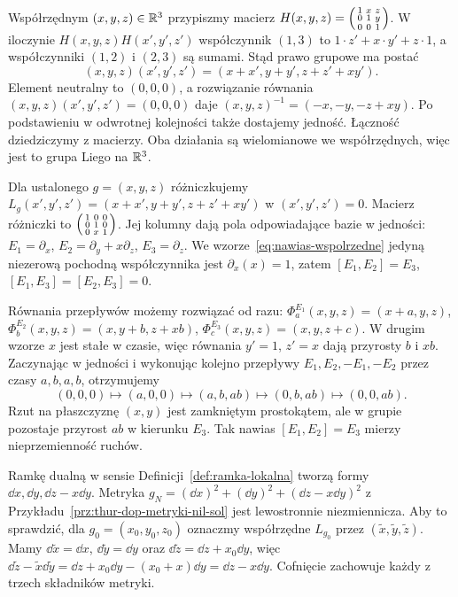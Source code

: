 \begin{przyklad}
\label{prz:lie-heisenberg}
Współrzędnym $(x,y,z)\in\mathbb{R}^3$ przypiszmy macierz
$H(x,y,z)=\begin{psmallmatrix}1&x&z\\0&1&y\\0&0&1\end{psmallmatrix}$.
W iloczynie $H(x,y,z)H(x',y',z')$ współczynnik $(1,3)$
to $1\cdot z'+x\cdot y'+z\cdot1$, a współczynniki $(1,2)$
i $(2,3)$ są sumami. Stąd prawo grupowe ma postać
\[
 (x,y,z)(x',y',z')=(x+x',y+y',z+z'+xy').
\]
Element neutralny to $(0,0,0)$, a rozwiązanie równania
$(x,y,z)(x',y',z')=(0,0,0)$ daje
$(x,y,z)^{-1}=(-x,-y,-z+xy)$.
Po podstawieniu w odwrotnej kolejności także dostajemy jedność.
Łączność dziedziczymy z macierzy. Oba działania są wielomianowe
we współrzędnych, więc jest to grupa Liego na $\mathbb{R}^3$.

Dla ustalonego $g=(x,y,z)$ różniczkujemy
$L_g(x',y',z')=(x+x',y+y',z+z'+xy')$
w $(x',y',z')=0$. Macierz różniczki to
$\begin{psmallmatrix}1&0&0\\0&1&0\\0&x&1\end{psmallmatrix}$.
Jej kolumny dają pola odpowiadające bazie w jedności:
$E_1=\partial_x$, $E_2=\partial_y+x\partial_z$,
$E_3=\partial_z$.
We wzorze~\eqref{eq:nawias-wspolrzedne} jedyną niezerową
pochodną współczynnika jest $\partial_x(x)=1$, zatem
$[E_1,E_2]=E_3$, $[E_1,E_3]=[E_2,E_3]=0$.

Równania przepływów możemy rozwiązać od razu:
$\Phi_a^{E_1}(x,y,z)=(x+a,y,z)$,
$\Phi_b^{E_2}(x,y,z)=(x,y+b,z+xb)$,
$\Phi_c^{E_3}(x,y,z)=(x,y,z+c)$.
W drugim wzorze $x$ jest stałe w czasie, więc równania
$y'=1$, $z'=x$ dają przyrosty $b$ i $xb$.
Zaczynając w jedności i wykonując kolejno przepływy
$E_1,E_2,-E_1,-E_2$ przez czasy $a,b,a,b$, otrzymujemy
\[
 (0,0,0)\longmapsto(a,0,0)\longmapsto(a,b,ab)
 \longmapsto(0,b,ab)\longmapsto(0,0,ab).
\]
Rzut na płaszczyznę $(x,y)$ jest zamkniętym prostokątem,
ale w grupie pozostaje przyrost $ab$ w kierunku $E_3$.
Tak nawias $[E_1,E_2]=E_3$ mierzy nieprzemienność ruchów.

Ramkę dualną w sensie Definicji~\ref{def:ramka-lokalna}
tworzą formy $\dd x,\dd y,\dd z-x\dd y$.
Metryka $g_N=(\dd x)^2+(\dd y)^2+(\dd z-x\dd y)^2$
z Przykładu~\ref{prz:thur-dop-metryki-nil-sol}
jest lewostronnie niezmiennicza. Aby to sprawdzić, dla
$g_0=(x_0,y_0,z_0)$ oznaczmy współrzędne $L_{g_0}$
przez $(\widetilde x,\widetilde y,\widetilde z)$.
Mamy $\dd\widetilde x=\dd x$, $\dd\widetilde y=\dd y$ oraz
$\dd\widetilde z=\dd z+x_0\dd y$, więc
$\dd\widetilde z-\widetilde x\dd\widetilde y
=\dd z+x_0\dd y-(x_0+x)\dd y=\dd z-x\dd y$.
Cofnięcie zachowuje każdy z trzech składników metryki.
\end{przyklad}


